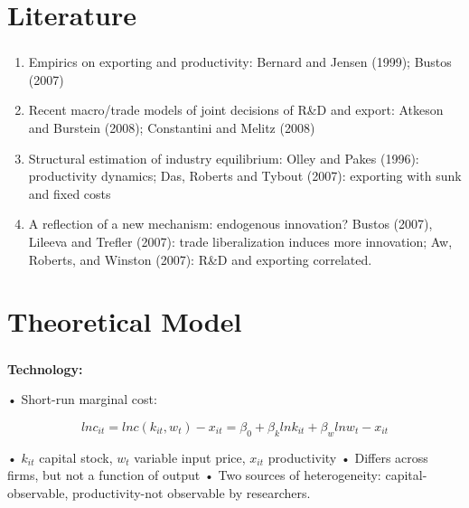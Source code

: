 \documentclass[c, dvipsnames]{beamer}  %
\begin{document}
%
%
%
%
%
%
%
%
%
%
%


\section{Literature}


\begin{frame}[shrink=3]
\frametitle{\insertsection} 

\begin{enumerate}
	\item Empirics on exporting and productivity: Bernard and Jensen (1999); Bustos (2007)
\item  Recent macro/trade models of joint decisions of R\&D and export:
Atkeson and Burstein (2008); Constantini and Melitz (2008)
\item  Structural estimation of industry equilibrium:
Olley and Pakes (1996): productivity dynamics;
Das, Roberts and Tybout (2007): exporting with sunk and
fixed costs

\item  A reflection of a new mechanism: endogenous innovation?
 Bustos (2007), Lileeva and Trefler (2007): trade liberalization induces more innovation;
 Aw, Roberts, and Winston (2007): R\&D and exporting
correlated.

\end{enumerate}


\end{frame}




\section{Theoretical Model}





\begin{frame}[shrink=3]
\frametitle{\insertsection} 

\textbf{Technology:}

• Short-run marginal cost:

$$lnc_{it} = lnc(k_{it},w_{t}) − x_{it} = \beta_0 + \beta_{k }lnk_{it} +\beta_{w} lnw_{t} − x_{it}$$

• $k_{it }$ capital stock, $w_{t}$ variable input price, $x_{it}$ productivity
• Differs across firms, but not a function of output
• Two sources of heterogeneity: capital-observable, productivity-not
observable by researchers.

\end{frame}
\end{document}
